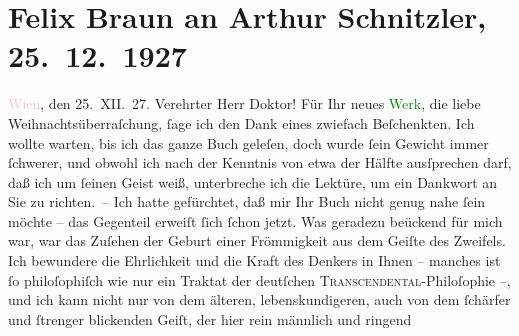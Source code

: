 

               \section[Felix Braun an Arthur Schnitzler, 25. 12. 1927]{ Felix Braun an Arthur Schnitzler, 25. 12. 1927}\nopagebreak{}\rehead{ }\normalsize\beginnumbering{} \toendnotes[C]{\smallbreak\pagebreak[2]} 
\toendnotes[C]{\smallbreak}\pstart
           \centering{}{\pb}\textcolor{pink}{Wien}{}\ledrightnote{\textcolor{pink}{Wien}}, den 25. XII. 27.\pend
           \pstart{}Verehrter Herr Doktor!\pend\pstart
           Für Ihr neues \textcolor{green}{Werk}{}, die liebe
               Weihnachtsüberraſchung, ſage ich den Dank eines zwiefach Beſchenkten. Ich wollte
               warten, bis ich das ganze Buch geleſen, doch wurde ſein Gewicht immer ſchwerer, und
               obwohl ich nach der Kenntnis von etwa der Hälfte ausſprechen darf, daß ich um ſeinen
               Geist weiß, unterbreche ich die Lektüre, um ein Dankwort an Sie zu richten. – \pend
           \pstart
           Ich hatte gefürchtet, daß mir Ihr Buch nicht genug \introOben{}nahe\introOben{} ſein
               möchte – das Gegenteil erweiſt ſich ſchon jetzt. Was geradezu beückend für {\pb}mich war, war das
               Zuſehen der Geburt einer Frömmigkeit aus dem Geiſte des Zweifels. Ich bewundere die
               Ehrlichkeit und die Kraft des Denkers in Ihnen – manches ist ſo philoſophiſch wie nur
               ein Traktat der deutſchen \textsc{Transcendental}-Philoſophie –, und
               ich kann nicht \introOben{}nur\introOben{} von dem älteren, lebenskundigeren, auch
               von dem ſchärfer und ſtrenger blickenden Geiſt, der hier rein männlich und ringend
